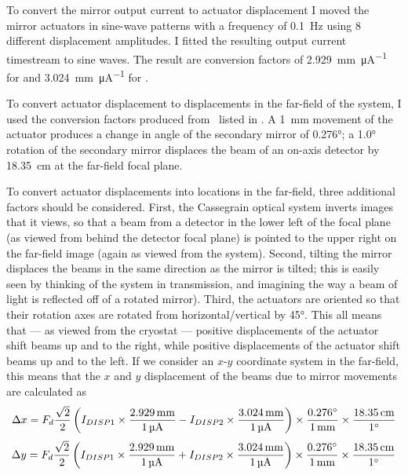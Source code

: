 To convert the mirror output current to actuator displacement I moved the mirror actuators in sine-wave patterns with a frequency of \SI{0.1}{\Hz} using 8 different displacement amplitudes.
I fitted the resulting output current timestream to sine waves.
The result are conversion factors of \SI{2.929}{\mm\per\uA} for  and \SI{3.024}{\mm\per\uA} for .

To convert actuator displacement to displacements in the far-field of the system, I used the conversion factors produced from \ZEMAX\ listed in .
A \SI{1}{\mm} movement of the actuator produces a change in angle of the secondary mirror of \ang{0.276}; a \ang{1.0} rotation of the secondary mirror displaces the beam of an on-axis detector by \SI{18.35}{\cm} at the far-field focal plane.

To convert actuator displacements into locations in the far-field, three additional factors should be considered.
First, the Cassegrain optical system inverts images that it views, so that a beam from a detector in the lower left of the focal plane (as viewed from behind the detector focal plane) is pointed to the upper right on the far-field image (again as viewed from the system).
Second, tilting the mirror displaces the beams in the same direction as the mirror is tilted; this is easily seen by thinking of the system in transmission, and imagining the way a beam of light is reflected off of a rotated mirror).
Third, the actuators are oriented so that their rotation axes are rotated from horizontal/vertical by \ang{45}.
This all means that --- as viewed from the cryostat --- positive displacements of the  actuator shift beams up and to the right, while positive displacements of the  actuator shift beams up and to the left.
If we consider an $x$-$y$ coordinate system in the far-field, this means that the $x$ and $y$ displacement of the beams due to mirror movements are calculated as
\begin{equation}
\Delta x = F_d \frac{\sqrt{2}}{2} \left( I_{\DISP1} \times \frac{\SI{2.929}{\mm}}{\SI{1}{\uA}} -
                              I_{\DISP2} \times \frac{\SI{3.024}{\mm}}{\SI{1}{\uA}}  \right) \times
    \frac{\ang{0.276}} {\SI{1}{\mm}} \times
    \frac{\SI{18.35}{\cm}} {\ang{1}}
\end{equation}
\begin{equation}
\Delta y = F_d \frac{\sqrt{2}}{2} \left( I_{\DISP1} \times \frac{\SI{2.929}{\mm}}{\SI{1}{\uA}} +
                              I_{\DISP2} \times \frac{\SI{3.024}{\mm}}{\SI{1}{\uA}}  \right) \times
    \frac{\ang{0.276}} {\SI{1}{\mm}} \times
    \frac{\SI{18.35}{\cm}} {\ang{1}}
\end{equation}

